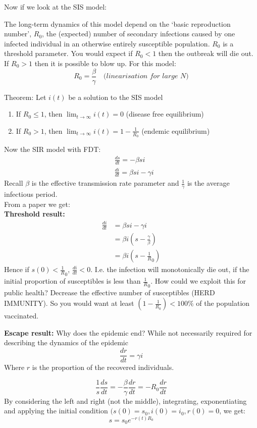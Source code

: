 \documentclass{X:/Documents/Coding/Latex/myassignment}
\begin{document}
Now if we look at the SIS model:


The long-term dynamics of this model depend on the `basic reproduction number', $R_0$, the (expected) number of secondary infections caused by one infected individual in an otherwise entirely susceptible population. $R_0$ is a threshold parameter. You would expect if $R_0 < 1$ then the outbreak will die out. If $R_0 >1$ then it is possible to blow up. For this model:
\[R_0 = \frac\beta\gamma   \quad \textit{(linearisation for large } N \textit{)} \]


Theorem:
Let $i(t)$ be a solution to the SIS model
\begin{enumerate}
    \item If $R_0 \leq 1$, then $\lim_{t\to\infty} i(t) = 0$ (disease free equilibrium)
    \item If $R_0 > 1$, then $\lim_{t\to\infty} i(t) = 1 - \frac{1}{R_0}$ (endemic equilibrium)
\end{enumerate}


Now the SIR model with FDT:\\
\begin{align*}
    &\frac{ds}{dt} = -\beta si\\
    &\frac{di}{dt} = \beta si - \gamma i
\end{align*}
Recall $\beta$ is the effective transmission rate parameter and $\frac1\gamma$ is the average infectious period.\\
From a paper we get:\\
\textbf{Threshold result: }
\begin{align*}
    \frac{di}{dt} &= \beta si - \gamma i\\
    &= \beta i(s - \frac\gamma\beta)\\
    &= \beta i(s - \frac1R_0)
\end{align*}
Hence if $s(0) < \frac1R_0$, $\frac{di}{dt} < 0$. I.e. the infection will monotonically die out, if the initial proportion of susceptibles is less than $\frac1R_0$.
How could we exploit this for public health? Decrease the effective number of susceptibles (HERD IMMUNITY). So you would want at least $(1-\frac{1}{R_0}) < 100\%$ of the population vaccinated.

\textbf{Escape result:}
Why does the epidemic end? While not necessarily required for describing the dynamics of the epidemic
\[\frac{dr}{dt} = \gamma i\]
Where $r$ is the proportion of the recovered individuals.

\[\frac1s \frac{ds}{dt} = -\frac\beta\gamma \frac{dr}{dt} = -R_0 \frac{dr}{dt}\] 
By considering the left and right (not the middle), integrating, exponentiating and applying the initial condition $(s(0) = s_0, i(0) = i_0, r(0) = 0$, we get:
\[s = s_0 e^{-r(t)  R_0}\]
\end{document}
